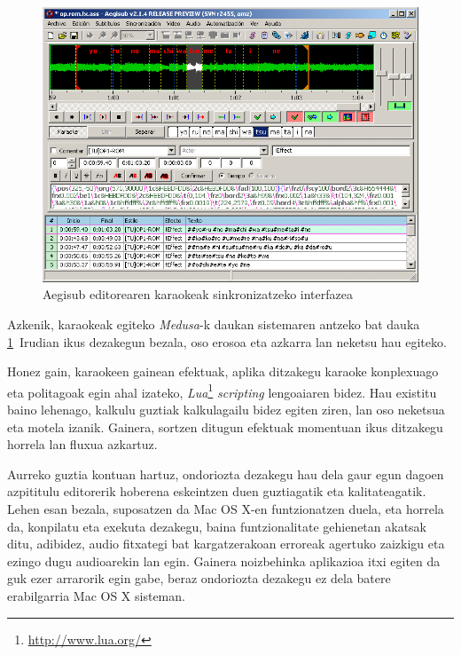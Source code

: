 \begin{figure}[htp]
\begin{center}
\includegraphics[width=\columnwidth, natwidth=728pt, natheight=532pt]{Pictures/Chapter2/aegisub-karaoke.png}
\caption{Aegisub editorearen karaokeak sinkronizatzeko interfazea}
\label{aegisub-karaoke}
\end{center}
\end{figure}

Azkenik, karaokeak egiteko \textit{Medusa}-k daukan sistemaren antzeko bat dauka \ref{aegisub-karaoke}~Irudian ikus dezakegun bezala, oso erosoa eta azkarra lan neketsu hau egiteko.

Honez gain, karaokeen gainean efektuak, aplika ditzakegu karaoke konplexuago eta politagoak egin ahal izateko, \textit{Lua}\footnote{\url{http://www.lua.org/}} \textit{scripting} lengoaiaren bidez. Hau existitu baino lehenago, kalkulu guztiak kalkulagailu bidez egiten ziren, lan oso neketsua eta motela izanik. Gainera, sortzen ditugun efektuak momentuan ikus ditzakegu horrela lan fluxua azkartuz.

Aurreko guztia kontuan hartuz, ondoriozta dezakegu hau dela gaur egun dagoen azpititulu editorerik hoberena eskeintzen duen guztiagatik eta kalitateagatik. Lehen esan bezala, suposatzen da Mac OS X-en funtzionatzen duela, eta horrela da, konpilatu eta exekuta dezakegu, baina funtzionalitate gehienetan akatsak ditu, adibidez, audio fitxategi bat kargatzerakoan erroreak agertuko zaizkigu eta ezingo dugu audioarekin lan egin. Gainera noizbehinka aplikazioa itxi egiten da guk ezer arrarorik egin gabe, beraz ondoriozta dezakegu ez dela batere erabilgarria Mac OS X sisteman.

